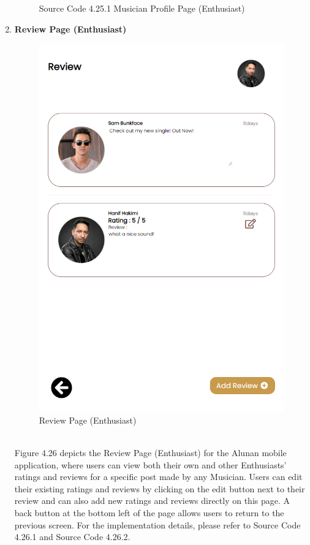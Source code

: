 \begin{enumerate}[1.]
\begin{figure}[h]
\begin{subfigure}[b]{0.7\textwidth}
            \label{fig:sub2}
        \end{subfigure}
        \caption*{Source Code 4.25.1 Musician Profile Page (Enthusiast)}
        \label{fig:myfig64a}
    \end{figure}
    \clearpage

    \item \textbf{Review Page (Enthusiast)}
    \begin{figure}[h]
        \centering
        \includegraphics[width=0.5\linewidth]{mainmatter/images/frontend/ss/Review (Enthusiast).png}
        \caption{Review Page (Enthusiast)}
        \label{fig:myfig65}
    \end{figure} \\
    Figure 4.26 depicts the Review Page (Enthusiast) for the Alunan mobile application, where users can view both their own and other Enthusiasts' ratings and reviews for a specific post made by any Musician. Users can edit their existing ratings and reviews by clicking on the edit button next to their review and can also add new ratings and reviews directly on this page. A back button at the bottom left of the page allows users to return to the previous screen. For the implementation details, please refer to Source Code 4.26.1 and Source Code 4.26.2.
    \clearpage
    \begin{figure}[h]\ContinuedFloat
        \centering
        \begin{subfigure}[b]{0.9\textwidth}
            \centering

\end{subfigure}
\end{figure}
\end{enumerate}
